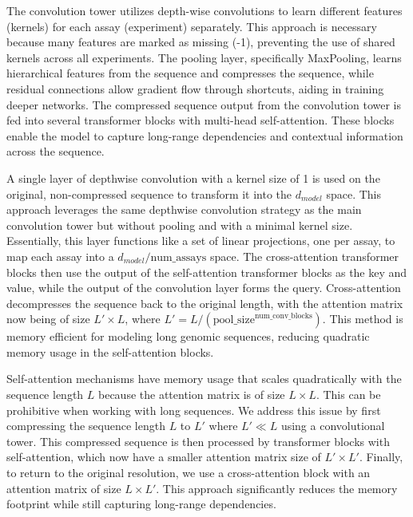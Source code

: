 \documentclass[twoside,11pt]{article}
\begin{document}
The convolution tower utilizes depth-wise convolutions to learn different features (kernels) for each assay (experiment) separately. This approach is necessary because many features are marked as missing (-1), preventing the use of shared kernels across all experiments. The pooling layer, specifically MaxPooling, learns hierarchical features from the sequence and compresses the sequence, while residual connections allow gradient flow through shortcuts, aiding in training deeper networks. The compressed sequence output from the convolution tower is fed into several transformer blocks with multi-head self-attention. These blocks enable the model to capture long-range dependencies and contextual information across the sequence. 

A single layer of depthwise convolution with a kernel size of 1 is used on the original, non-compressed sequence to transform it into the \(d_{model}\) space. This approach leverages the same depthwise convolution strategy as the main convolution tower but without pooling and with a minimal kernel size. Essentially, this layer functions like a set of linear projections, one per assay, to map each assay into a \(d_{model} / \text{num\_assays}\) space. The cross-attention transformer blocks then use the output of the self-attention transformer blocks as the key and value, while the output of the convolution layer forms the query. Cross-attention decompresses the sequence back to the original length, with the attention matrix now being of size \(L' \times L\), where \(L' = L / (\text{pool\_size} ^ \text{num\_conv\_blocks})\). This method is memory efficient for modeling long genomic sequences, reducing quadratic memory usage in the self-attention blocks.

Self-attention mechanisms have memory usage that scales quadratically with the sequence length \(L\) because the attention matrix is of size \(L \times L\). This can be prohibitive when working with long sequences. We address this issue by first compressing the sequence length \(L\) to  \(L'\) where \(L' \ll L\) using a convolutional tower. This compressed sequence is then processed by transformer blocks with self-attention, which now have a smaller attention matrix size of \(L' \times L'\). Finally, to return to the original resolution, we use a cross-attention block with an attention matrix of size \(L \times L'\). This approach significantly reduces the memory footprint while still capturing long-range dependencies.
\end{document}
